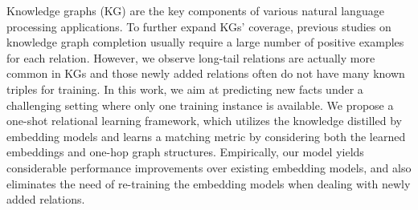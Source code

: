 Knowledge graphs (KG) are the key components of various natural language processing applications. To further expand KGs' coverage, previous studies on knowledge graph completion usually require a large number of positive examples for each relation. However, we observe long-tail relations are actually more common in KGs and those newly added relations often do not have many known triples for training. In this work, we aim at predicting new facts under a challenging setting where only one training instance is available. We propose a one-shot relational learning framework, which utilizes the knowledge distilled by embedding models and learns a matching metric by considering both the learned embeddings and one-hop graph structures. Empirically, our model yields considerable performance improvements over existing embedding models, and also eliminates the need of re-training the embedding models when dealing with newly added relations.
